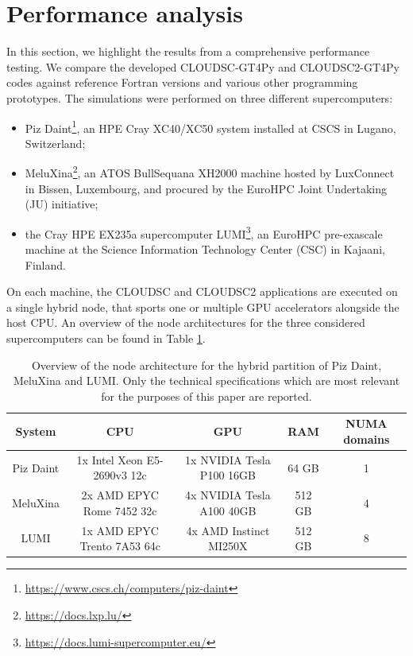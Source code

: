 \documentclass[main.tex]{subfiles}
\begin{document}
    \justifying

    \section{Performance analysis}
    \label{section:performance-analysis}

        In this section, we highlight the results from a comprehensive performance testing. We compare the developed CLOUDSC-GT4Py and CLOUDSC2-GT4Py codes against reference Fortran versions and various other programming prototypes. The simulations were performed on three different supercomputers:
        \begin{itemize}
            \item[(i)] Piz Daint\footnote{\url{https://www.cscs.ch/computers/piz-daint}}, an HPE Cray XC40/XC50 system installed at CSCS in Lugano, Switzerland;
            \item[(ii)] MeluXina\footnote{\url{https://docs.lxp.lu/}}, an ATOS BullSequana XH2000 machine hosted by LuxConnect in Bissen, Luxembourg, and procured by the EuroHPC Joint Undertaking (JU) initiative;
            \item[(iii)] the Cray HPE EX235a supercomputer LUMI\footnote{\url{https://docs.lumi-supercomputer.eu/}}, an EuroHPC pre-exascale machine at the Science Information Technology Center (CSC) in Kajaani, Finland.
        \end{itemize}
        On each machine, the CLOUDSC and CLOUDSC2 applications are executed on a single hybrid node, that sports one or multiple GPU accelerators alongside the host CPU. An overview of the node architectures for the three considered supercomputers can be found in Table \ref{tab:architecture}.

        \begin{table}[t!]
            \setlength\extrarowheight{2pt}
            \centering
            \begin{tabular}{|c|c|c|c|c|}
                 \hline
                 \textbf{System} & \textbf{CPU} & \textbf{GPU} & \textbf{RAM} & \textbf{NUMA domains} \\
                 \hline
                 Piz Daint & 1x Intel Xeon E5-2690v3 12c & 1x NVIDIA Tesla P100 16GB & 64 GB & 1 \\
                 MeluXina & 2x AMD EPYC Rome 7452 32c & 4x NVIDIA Tesla A100 40GB & 512 GB & 4 \\
                 LUMI & 1x AMD EPYC Trento 7A53 64c & 4x AMD Instinct MI250X & 512 GB & 8 \\
                 \hline
            \end{tabular}
            \vspace*{0.2cm}
            \caption{Overview of the node architecture for the hybrid partition of Piz Daint, MeluXina and LUMI. Only the technical specifications which are most relevant for the purposes of this paper are reported.}
            \label{tab:architecture}
        \end{table}
\end{document}
